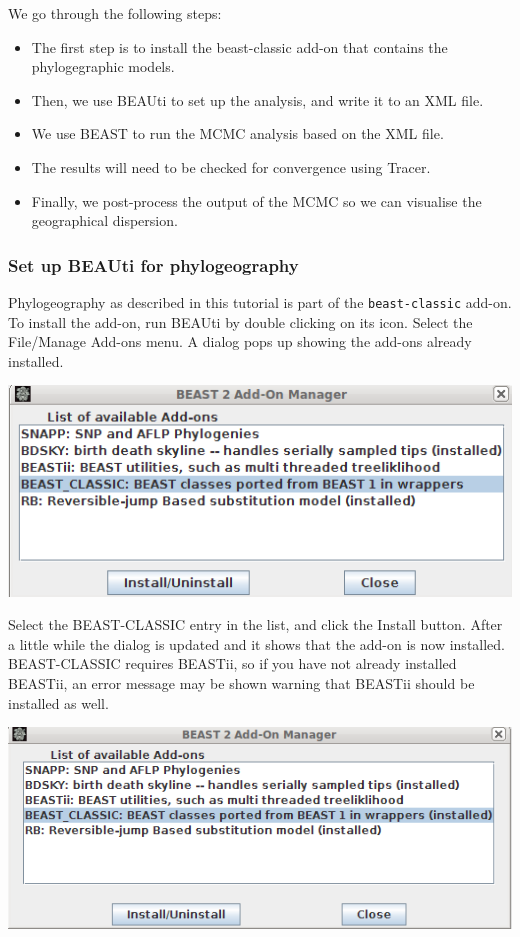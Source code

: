 \documentclass{article}
\begin{document}
We go through the following steps:
\begin{itemize}
\item The first step is to install the beast-classic add-on that contains the phylogegraphic models. 
\item Then, we use BEAUti to set up the analysis, and write it to an XML file.
\item We use BEAST to run the MCMC analysis based on the XML file.
\item The results will need to be checked for convergence using Tracer.
\item Finally, we post-process the output of the MCMC so we can visualise the geographical dispersion.
\end{itemize}

\subsubsection*{Set up BEAUti for phylogeography}

Phylogeography as described in this tutorial is part of the {\tt beast-classic} add-on.
To install the add-on, run BEAUti by double clicking on its icon. 
Select the File/Manage Add-ons menu. A dialog pops up showing the add-ons already installed. 

\begin{center}
\includegraphics[scale=0.4]{figures/addonmgr.png}
\end{center}


Select the BEAST-CLASSIC entry in the list, and click the Install button. After a little while the dialog is updated and it shows that the add-on is now installed.
BEAST-CLASSIC requires BEASTii, so if you have not already installed BEASTii, an error message may be shown warning that BEASTii should be installed as well.

\begin{center}
\includegraphics[scale=0.4]{figures/addonmgr2.png}
\end{center}
\end{document}
